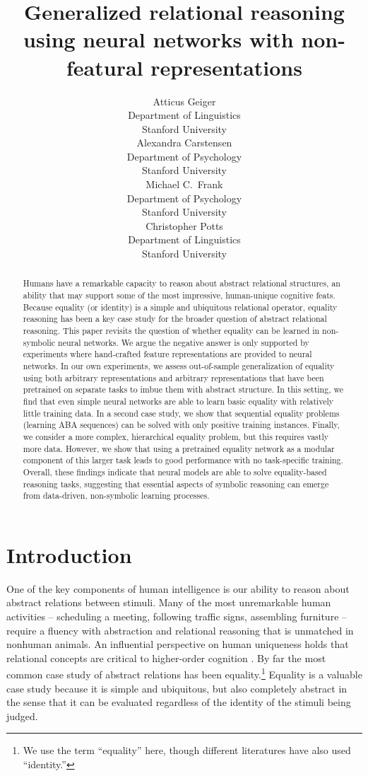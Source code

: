 \documentclass{article}
\title{Generalized relational reasoning using neural networks with non-featural representations}
\author{%
  Atticus Geiger \\
  Department of Linguistics\\
  Stanford University \\
  \And
  Alexandra Carstensen \\
  Department of Psychology \\
  Stanford University \\
  \AND
  Michael C.~Frank \\
  Department of Psychology \\
  Stanford University \\
  \And
  Christopher Potts \\
  Department of Linguistics\\
  Stanford University
}
\newcommand{\update}[1]{{\color{darkblue}#1}}
\newcommand{\updatea}[1]{{\color{darkred}#1}}
\begin{document}
\maketitle

\begin{abstract}
\update{%
  Humans have a remarkable capacity to reason about abstract relational structures, an ability that may support some of the most impressive, human-unique cognitive feats. Because equality (or identity) is a simple and ubiquitous relational operator, equality reasoning has been a key case study for the broader question of abstract relational reasoning. This paper revisits the question of whether equality can be learned in non-symbolic neural networks. \updatea{We argue the negative answer is only supported by experiments where hand-crafted feature representations are provided to neural networks.} In our own experiments, we assess out-of-sample generalization of equality using both arbitrary representations and arbitrary representations that have been pretrained on separate tasks to imbue them with abstract structure. In this setting, we find that even simple neural networks are able to learn basic equality with relatively little training data. In a second case study, we show that sequential equality problems (learning ABA sequences) can be solved with only positive training instances. Finally, we consider a more complex, hierarchical equality problem, but this requires vastly more data. However, we show that using a pretrained equality network as a modular component of this larger task leads to good performance with no task-specific training. Overall, these findings indicate that neural models are able to solve equality-based reasoning tasks, suggesting that essential aspects of symbolic reasoning can emerge from data-driven, non-symbolic learning processes.%
}
\end{abstract}


\section{Introduction}\label{sec:introduction}

One of the key components of human intelligence is our ability to reason about abstract relations between stimuli. Many of the most unremarkable human activities -- scheduling a meeting, following traffic signs, assembling furniture -- require a fluency with abstraction and relational reasoning that is unmatched in nonhuman animals. An influential perspective on human uniqueness holds that relational concepts are critical to higher-order cognition \citep[e.g.,][]{Gentner:2003}. By far the most common case study of abstract relations has been equality.\footnote{We use the term ``equality'' here, though different literatures have also used ``identity.''} Equality is a valuable case study because it is simple and ubiquitous, but also completely abstract in the sense that it can be evaluated regardless of the identity of the stimuli being judged.
\end{document}
